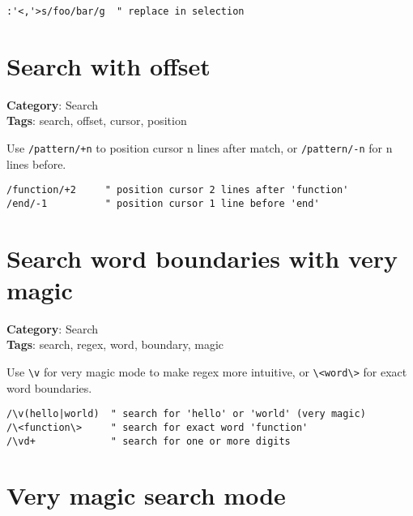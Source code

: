 {{{{{{{{{{{{{{\begin{Exa*}{}
\begin{Verbatim}[fontsize=\footnotesize, breaklines, breakanywhere]
:'<,'>s/foo/bar/g  " replace in selection
\end{Verbatim}
\end{Exa*}

\section{Search with offset}

\textbf{Category}: Search\\ \textbf{Tags}: search, offset, cursor, position
\vspace{0.5cm}

Use {\footnotesize \Verb§/pattern/+n§} to position cursor n lines after match, or {\footnotesize \Verb§/pattern/-n§} for n lines before.

\begin{Exa*}{}
\begin{Verbatim}[fontsize=\footnotesize, breaklines, breakanywhere]
/function/+2     " position cursor 2 lines after 'function'
/end/-1          " position cursor 1 line before 'end'
\end{Verbatim}
\end{Exa*}

\section{Search word boundaries with very magic}

\textbf{Category}: Search\\ \textbf{Tags}: search, regex, word, boundary, magic
\vspace{0.5cm}

Use {\footnotesize \Verb§\v§} for very magic mode to make regex more intuitive, or {\footnotesize \Verb§\<word\>§} for exact word boundaries.

\begin{Exa*}{}
\begin{Verbatim}[fontsize=\footnotesize, breaklines, breakanywhere]
/\v(hello|world)  " search for 'hello' or 'world' (very magic)
/\<function\>     " search for exact word 'function'
/\vd+             " search for one or more digits
\end{Verbatim}
\end{Exa*}

\section{Very magic search mode}

}}}}}}}}}}}}}}

